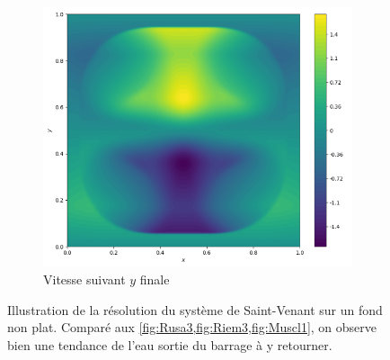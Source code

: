 \documentclass[
	french,
	11pt, %
]{fphw}
\begin{document}
\begin{figure}[H]
\begin{subfigure}{0.32\textwidth}
		\label{fig:Bonus1u}
	\end{subfigure}
	\begin{subfigure}{0.32\textwidth}
		\centering
		\includegraphics[width=\textwidth,height=0.85\textwidth]{Bonus1v.png}
		\caption{Vitesse suivant $y$ finale}
		\label{fig:Bonus1v}
	\end{subfigure}
	\caption{Illustration de la résolution du système de Saint-Venant sur un fond non plat. Comparé aux \cref{fig:Rusa3,fig:Riem3,fig:Muscl1}, on observe bien une tendance de l'eau sortie du barrage à y retourner.}
	\label{fig:Bonus1}
\end{figure}
\end{document}
